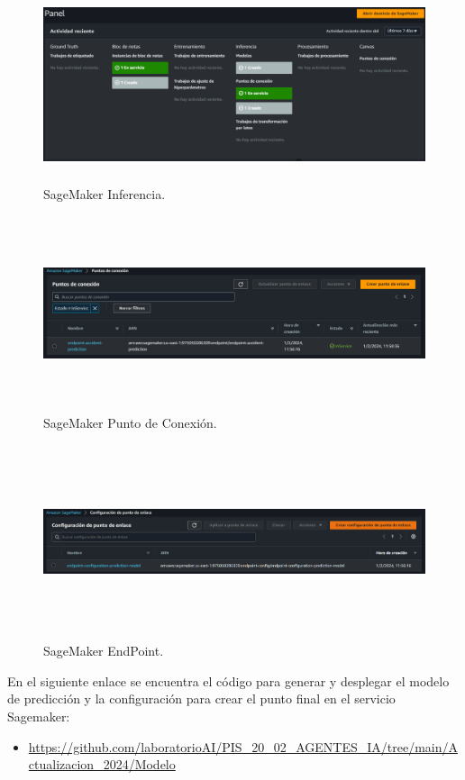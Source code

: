 \documentclass[a4paper,10pt, oneside, titlepage]{article}
\begin{document}
	\begin{figure}[!h]
		\centering
		\includegraphics[width = 1\linewidth, height = 5.7cm]{SageMaker_Inferencia.png}
		\caption{SageMaker Inferencia.}
		\label{SageMaker_Inferencia}
	\end{figure}
	\begin{figure}[!h]
		\centering
		\includegraphics[width = 1\linewidth, height = 5.7cm]{SageMaker_Punto_Conexion.png}
		\caption{SageMaker Punto de Conexión.}
		\label{SageMaker_Punto_Conexion}
	\end{figure}
	\begin{figure}[!h]
		\centering
		\includegraphics[width = 1\linewidth, height = 5.7cm]{SageMaker_EndPoint.png}
		\caption{SageMaker EndPoint.}
		\label{SageMaker_EndPoint}
	\end{figure}
	\indent \indent En el siguiente enlace se encuentra el código para generar y desplegar el modelo de predicción y la configuración para crear el punto final en el servicio Sagemaker:
	\begin{itemize}
		\item \textcolor{blue}{\url{https://github.com/laboratorioAI/PIS_20_02_AGENTES_IA/tree/main/Actualizacion_2024/Modelo}}
	\end{itemize}
\end{document}
